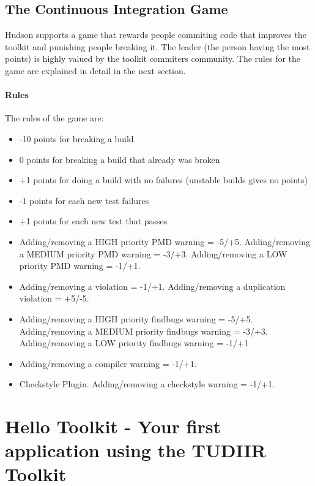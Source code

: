 \documentclass[a4paper,twoside]{book}      %
\begin{document}
\subsection{The Continuous Integration Game}
\label{sec:cigame}
Hudson supports a game that rewards people commiting code that improves the toolkit and punishing people breaking it. The leader (the person having the most points) is highly valued by the toolkit commiters community. The rules for the game are explained in detail in the next section.
\paragraph{Rules}
The rules of the game are:
\begin{itemize}
\item -10 points for breaking a build
\item 0 points for breaking a build that already was broken
\item +1 points for doing a build with no failures (unstable builds gives no points)
\item -1 points for each new test failures
\item +1 points for each new test that passes
\item Adding/removing a HIGH priority PMD warning = -5/+5. Adding/removing a MEDIUM priority PMD warning = -3/+3. Adding/removing a LOW priority PMD warning = -1/+1.
\item Adding/removing a violation = -1/+1. Adding/removing a duplication violation = +5/-5.
\item Adding/removing a HIGH priority findbugs warning = -5/+5. Adding/removing a MEDIUM priority findbugs warning = -3/+3. Adding/removing a LOW priority findbugs warning = -1/+1
\item Adding/removing a compiler warning = -1/+1.
\item Checkstyle Plugin. Adding/removing a checkstyle warning = -1/+1.
\end{itemize}

\section{Hello Toolkit - Your first application using the TUDIIR Toolkit}
\end{document}
